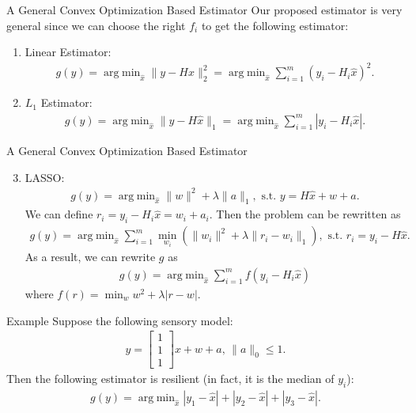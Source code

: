 \documentclass{beamer}
\DeclareMathOperator{\argmin}{arg\;min}
\begin{document}
\begin{frame}{A General Convex Optimization Based Estimator}
  Our proposed estimator is very general since we can choose the right $f_i$ to get the following estimator:
  \begin{enumerate}
  \item Linear Estimator:
    \begin{align*}
      g(y) = \argmin_{\hat x} \|y-H\hat x\|_2^2= \argmin_{\hat x}  \sum_{i=1}^m (y_i-H_i\hat x)^2.
    \end{align*}
  \item $L_1$ Estimator:
    \begin{align*}
      g(y) = \argmin_{\hat x} \|y-H\hat x\|_1=\argmin_{\hat x} \sum_{i=1}^m |y_i-H_i\hat x|.
    \end{align*}
  \end{enumerate}
\end{frame}


\begin{frame}{A General Convex Optimization Based Estimator}
  \begin{enumerate}  \setcounter{enumi}{2}

  \item LASSO:
    \begin{align*}
      g(y) = \argmin_{\hat x} \|w\|^2+\lambda \|a\|_1, \text{ s.t. }y=H\hat x+w+a.
    \end{align*}
    We can define $r_i = y_i-H_i\hat x = w_i+a_i$. Then the problem can be rewritten as
    \begin{align*}
      g(y) = \argmin_{\hat x}\sum_{i=1}^m \min_{w_i}\left(\|w_i\|^2+\lambda \|r_i-w_i\|_1\right), \text{ s.t. }r_i=y_i-H\hat x.
    \end{align*}
    As a result, we can rewrite $g$ as
    \begin{align*}
      g(y) = \argmin_{\hat x} \sum_{i=1}^m f(y_i-H_i\hat x)
    \end{align*}
    where $f(r) = \min_{w} w^2 + \lambda |r-w|.$
  \end{enumerate}
\end{frame}

\begin{frame}{Example}
  Suppose the following sensory model:
  \begin{align*}
    y = \begin{bmatrix}
      1\\
      1\\
      1
    \end{bmatrix}x + w+a,\,\|a\|_0\leq 1.
  \end{align*}
  Then the following estimator is resilient (in fact, it is the median of $y_i$):
  \begin{align*}
    g(y) = \argmin_{\hat x}  |y_1-\hat x|+|y_2-\hat x|+|y_3-\hat x|.
  \end{align*}
\end{frame}
\end{document}
